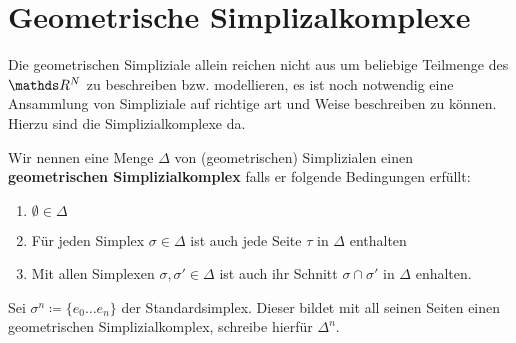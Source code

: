 
\section{Geometrische Simplizalkomplexe}

Die geometrischen Simpliziale allein reichen nicht aus um beliebige 
Teilmenge des $\R^N$ zu beschreiben bzw. modellieren, es ist noch notwendig eine Ansammlung
von Simpliziale auf richtige art und Weise beschreiben zu können. Hierzu
sind die Simplizialkomplexe da.

\begin{Def}
	Wir nennen eine Menge $\Delta$ von (geometrischen) Simplizialen einen \textbf{geometrischen Simplizialkomplex}
	falls er folgende Bedingungen erfüllt:
	\begin{enumerate}[(K1)]
		\item $\emptyset \in \Delta$
		\item Für jeden Simplex $\sigma \in \Delta$ ist auch jede Seite
		$\tau$ in $\Delta$ enthalten
		\item Mit allen Simplexen $\sigma, \sigma' \in \Delta$ ist auch ihr
		Schnitt $\sigma \cap \sigma'$ in $\Delta$ enhalten.
	\end{enumerate}
\end{Def}

\begin{Bsp}
	\item Sei $\sigma^n \coloneqq \{ e_0 \ldots e_n \}$ der Standardsimplex.
		Dieser bildet mit all seinen Seiten einen geometrischen Simplizialkomplex, schreibe hierfür $\Delta^n$.
\end{Bsp}



